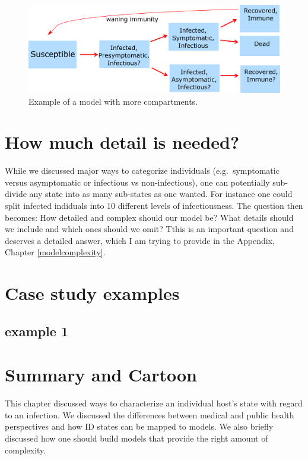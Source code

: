 \documentclass[]{book}
\theoremstyle{definition}
\theoremstyle{definition}
\theoremstyle{definition}
\theoremstyle{remark}
\begin{document}
\begin{figure}
\centering
\includegraphics{./images/ComplicatedModel.png}
\caption{\label{fig:complicatedmodel}Example of a model with more
compartments.}
\end{figure}

\section{How much detail is needed?}\label{how-much-detail-is-needed}

While we discussed major ways to categorize individuals
(e.g.~symptomatic versus asymptomatic or infectious vs non-infectious),
one can potentially sub-divide any state into as many sub-states as one
wanted. For instance one could split infected indiduals into 10
different levels of infectiousness. The question then becomes: How
detailed and complex should our model be? What details should we include
and which ones should we omit? Tthis is an important question and
deserves a detailed answer, which I am trying to provide in the
Appendix, Chapter \ref{modelcomplexity}.

\section{Case study examples}\label{case-study-examples}

\subsection{example 1}\label{example-1}

\section{Summary and Cartoon}\label{summary-and-cartoon-1}

This chapter discussed ways to characterize an individual host's state
with regard to an infection. We discussed the differences between
medical and public health perspectives and how ID states can be mapped
to models. We also briefly discussed how one should build models that
provide the right amount of complexity.
\end{document}
